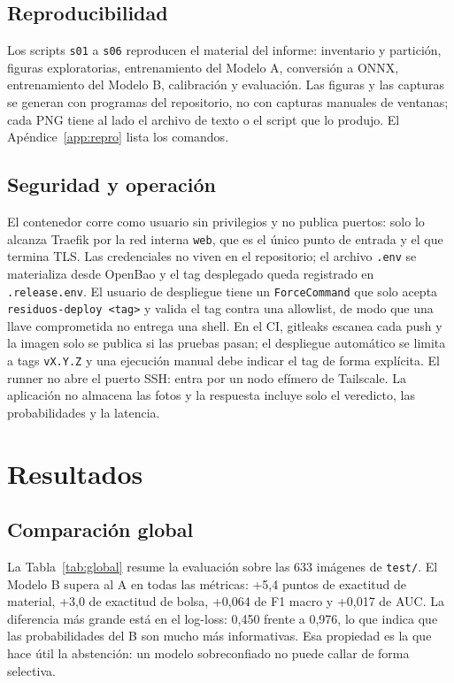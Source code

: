 \documentclass[10pt]{ieeeconf}
\begin{document}
\subsection{Reproducibilidad}

Los scripts \texttt{s01} a \texttt{s06} reproducen el material del informe:
inventario y partici\'on, figuras exploratorias, entrenamiento del Modelo A,
conversi\'on a ONNX, entrenamiento del Modelo B, calibraci\'on y evaluaci\'on. Las
figuras y las capturas se generan con programas del repositorio, no con capturas
manuales de ventanas; cada PNG tiene al lado el archivo de texto o el script que
lo produjo. El Ap\'endice~\ref{app:repro} lista los comandos.

\subsection{Seguridad y operaci\'on}

El contenedor corre como usuario sin privilegios y no publica puertos: solo lo
alcanza Traefik por la red interna \texttt{web}, que es el \'unico punto de
entrada y el que termina TLS. Las credenciales no viven en el repositorio; el
archivo \texttt{.env} se materializa desde OpenBao y el tag desplegado queda
registrado en \texttt{.release.env}. El usuario de despliegue tiene un
\texttt{ForceCommand} que solo acepta \texttt{residuos-deploy <tag>} y valida el
tag contra una allowlist, de modo que una llave comprometida no entrega una
shell. En el CI, gitleaks escanea cada push y la imagen solo se publica si las
pruebas pasan; el despliegue autom\'atico se limita a tags \texttt{vX.Y.Z} y una
ejecuci\'on manual debe indicar el tag de forma expl\'icita. El runner no abre el
puerto SSH: entra por un nodo ef\'imero de Tailscale. La aplicaci\'on no
almacena las fotos y la respuesta incluye solo el veredicto, las probabilidades
y la latencia.

\section{Resultados}
\label{sec:resultados}

\subsection{Comparaci\'on global}

La Tabla~\ref{tab:global} resume la evaluaci\'on sobre las 633 im\'agenes de
\texttt{test/}. El Modelo B supera al A en todas las m\'etricas: +5,4 puntos de
exactitud de material, +3,0 de exactitud de bolsa, +0,064 de F1 macro y +0,017 de
AUC. La diferencia m\'as grande est\'a en el log-loss: 0,450 frente a 0,976, lo
que indica que las probabilidades del B son mucho m\'as informativas. Esa
propiedad es la que hace \'util la abstenci\'on: un modelo sobreconfiado no puede
callar de forma selectiva.
\end{document}
